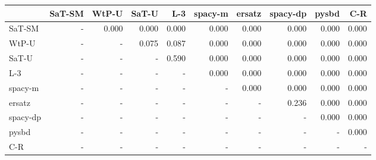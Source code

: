 \begin{tabular}{lrrrrrrrrr}
\toprule
 & SaT-SM & WtP-U & SaT-U & L-3 & spacy-m & ersatz & spacy-dp & pysbd & C-R \\
\midrule
SaT-SM & - & 0.000 & 0.000 & 0.000 & 0.000 & 0.000 & 0.000 & 0.000 & 0.000 \\
WtP-U & - & - & 0.075 & 0.087 & 0.000 & 0.000 & 0.000 & 0.000 & 0.000 \\
SaT-U & - & - & - & 0.590 & 0.000 & 0.000 & 0.000 & 0.000 & 0.000 \\
L-3 & - & - & - & - & 0.000 & 0.000 & 0.000 & 0.000 & 0.000 \\
spacy-m & - & - & - & - & - & 0.000 & 0.000 & 0.000 & 0.000 \\
ersatz & - & - & - & - & - & - & 0.236 & 0.000 & 0.000 \\
spacy-dp & - & - & - & - & - & - & - & 0.000 & 0.000 \\
pysbd & - & - & - & - & - & - & - & - & 0.000 \\
C-R & - & - & - & - & - & - & - & - & - \\
\bottomrule
\end{tabular}

